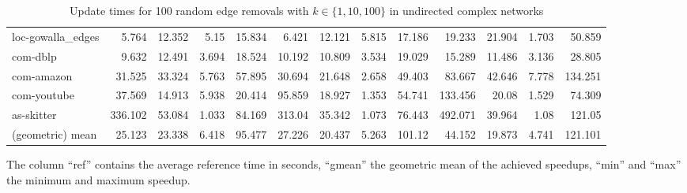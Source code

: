 \begin{landscape}
\begin{table}[h!]
\begin{tabular}{l|rrrr|rrrr|rrrr}
 loc-gowalla\_edges    &   5.764 &  12.352 &  5.15  &  15.834 &   6.421 &  12.121 &  5.815 &  17.186 &  19.233 &  21.904 &  1.703 &  50.859 \\
 com-dblp     &   9.632 &  12.491 &  3.694 &  18.524 &  10.192 &  10.809 &  3.534 &  19.029 &  15.289 &  11.486 &  3.136 &  28.805 \\
 com-amazon   &  31.525 &  33.324 &  5.763 &  57.895 &  30.694 &  21.648 &  2.658 &  49.403 &  83.667 &  42.646 &  7.778 & 134.251 \\
 com-youtube  &  37.569 &  14.913 &  5.938 &  20.414 &  95.859 &  18.927 &  1.353 &  54.741 & 133.456 &  20.08  &  1.529 &  74.309 \\
 as-skitter           & 336.102 &  53.084 &  1.033 &  84.169 & 313.04  &  35.342 &  1.073 &  76.443 & 492.071 &  39.964 &  1.08  & 121.05  \\ \midrule \midrule
 (geometric) mean     &  25.123 &  23.338 &  6.418 &  95.477 &  27.226 &  20.437 &  5.263 & 101.12  &  44.152 &  19.873 &  4.741 & 121.101 \\
\bottomrule
\end{tabular}
\caption{Update times for 100 random edge removals with  $k \in \{1, 10, 100\}$ in undirected complex networks}{The column ``ref'' contains the average reference time in seconds, ``gmean'' the geometric mean of the achieved speedups, ``min'' and ``max'' the minimum and maximum speedup.}
\label{tbl:removalsUndirectedComplex}
\end{table}

\end{landscape}


